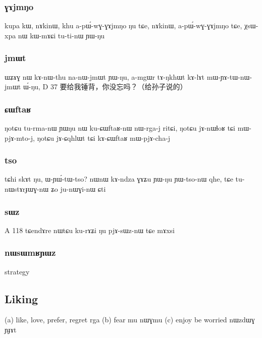\documentclass[oldfontcommands,oneside,a4paper,11pt]{article}
\begin{document}
\subsubsection{ɣɤjmŋo}
kupa kɯ, nɤkinɯ, khu a-pɯ́-wɣ-ɣɤjmŋo ŋu tɕe, nɤkinɯ,
a-pɯ́-wɣ-ɣɤjmŋo tɕe, χsɯ-xpa nɯ kɯ-mɤɕi tu-ti-nɯ ɲɯ-ŋu
\subsubsection{jmɯt}

ɯʑɤɣ nɯ kɤ-nɯ-thu na-nɯ-jmɯt ɲɯ-ŋu,
a-mgɯr	tɤ-ŋkhɯt	kɤ-lɤt	mɯ-ɲɤ-tɯ-nɯ-jmɯt	ɯ́-ŋu,
D	37	要给我锤背，你没忘吗？（给孙子说的）

\subsubsection{ɕɯftaʁ}
ŋotɕu tu-rma-nɯ ɲɯŋu nɯ ku-ɕɯftaʁ-nɯ
nɯ-rga-j ritɕi, ŋotɕu jɤ-nɯɬoʁ tɕi mɯ-pjɤ-mto-j,
ŋotɕu jɤ-ɕqhlɯt tɕi kɤ-ɕɯftaʁ mɯ-pjɤ-cha-j

\subsubsection{tso}
tɕhi skɤt ŋu, ɯ-ɲɯ́-tɯ-tso?
nɯnɯ kɤ-ndza ɣɤʑu ɲɯ-ŋu ɲɯ-tso-nɯ qhe, tɕe
tu-nɯstɤrɟɯɣ-nɯ ʑo ju-nɯɣi-nɯ ɕti

\subsubsection{sɯz}

A 118 tɕendɤre nɯtɕu ku-rɤʑi ŋu pjɤ-sɯz-nɯ tɕe
mɤxsi

\subsubsection{nɯsɯmʁɲɯz}
strategy
  \subsection{Liking} 

(a) like, love, prefer, regret
rga
(b) fear
mu nɯɣmu
(c) enjoy
be worried 
nɯzdɯɣ
ɲɟɤt


\citealt{jacques13tropative}
\end{document}
